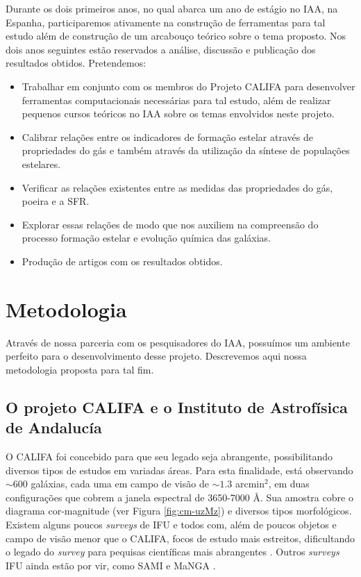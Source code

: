 \documentclass[a4paper,12pt]{article}
\begin{document}
Durante os dois primeiros anos, no qual abarca um ano de estágio no IAA, na Espanha, participaremos
ativamente na construção de ferramentas para tal estudo além de construção de um arcabouço teórico
sobre o tema proposto. Nos dois anos seguintes estão reservados a análise, discussão e publicação
dos resultados obtidos. Pretendemos:

\begin{itemize}
  \item Trabalhar em conjunto com os membros do Projeto CALIFA para desenvolver ferramentas
  computacionais necessárias para tal estudo, além de realizar pequenos cursos teóricos no IAA sobre
  os temas envolvidos neste projeto.
  \item Calibrar relações entre os indicadores de formação estelar através de propriedades do gás e
  também através da utilização da síntese de populações estelares.
  \item Verificar as relações existentes entre as medidas das propriedades do gás, poeira e a SFR.
  \item Explorar essas relações de modo que nos auxiliem na compreensão do processo formação estelar
  e evolução química das galáxias.
  \item Produção de artigos com os resultados obtidos.
\end{itemize}

\section{Metodologia}
\vspace{0.3cm}
Através de nossa parceria com os pesquisadores do IAA, possuímos um ambiente perfeito para o
desenvolvimento desse projeto. Descrevemos aqui nossa metodologia proposta para tal fim.

\subsection{O projeto CALIFA e o Instituto de Astrofísica de Andalucía}
\vspace{0.3cm}
O CALIFA foi concebido para que seu legado seja abrangente, possibilitando diversos tipos de estudos
em variadas áreas. Para esta finalidade, está observando $\sim 600$ galáxias, cada uma em campo de
visão de $\sim1.3$ arcmin$^2$, em duas configurações que cobrem a janela espectral de 3650-7000 \AA.
Sua amostra cobre o diagrama cor-magnitude (ver Figura \ref{fig:cm-uzMz}) e diversos tipos
morfológicos. Existem alguns poucos {\em surveys} de IFU e todos com, além de poucos objetos e campo
de visão menor que o CALIFA, focos de estudo mais estreitos, dificultando o legado do {\em survey}
para pequisas científicas mais abrangentes \citep[SAURON;][região central de 72 galáxias com $z <
0.01$.]{deZeeuw.etal.2002a} \citep[PINGS;][algumas galáxias muito próximas ($\sim 10$ Mpc) e o
estudo atual de 70 (U)LIRGs com $z <0.26$]{RosalesOrtega.etal.2010a} \citep[VENGA;][$30$ galáxias
espirais]{Blanc.etal.2010a} \citep[ATLAS\textsuperscript{3D};][260 galáxias {\em early-type}
próximas]{Cappellari.etal.2011a}. Outros {\em surveys} IFU ainda estão por vir, como SAMI
\citep{Croom.etal.2012a} e MaNGA \citep{Bundy.etal.2015a}.
\end{document}
